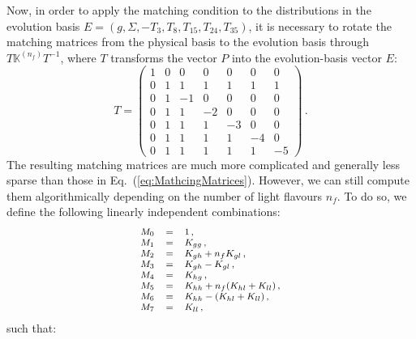 \documentclass[10pt,a4paper]{article}
\begin{document}
Now, in order to apply the matching condition to the distributions in
the evolution basis $E=(g,\Sigma,-T_3,T_8,T_{15},T_{24},T_{35})$, it is
necessary to rotate the matching matrices from the physical basis to
the evolution basis through $T\mathbb{K}^{(n_f)}T^{-1}$, where $T$
transforms the vector $P$ into the evolution-basis vector $E$:
\begin{equation}\label{eq:RotationMatrix}
T = 
\begin{pmatrix}
1 & 0 & 0  & 0  & 0  & 0  & 0 \\
0 & 1 & 1  & 1  & 1  & 1  & 1 \\
0 & 1 & -1  & 0  & 0  & 0  & 0 \\
0 & 1 & 1  & -2  & 0  & 0  & 0 \\
0 & 1 & 1  & 1  & -3  & 0  & 0 \\
0 & 1 & 1  & 1  & 1  & -4  & 0 \\
0 & 1 & 1  & 1  & 1  & 1  & -5
\end{pmatrix}\,.
\end{equation}
The resulting matching matrices are much more complicated and
generally less sparse than those in
Eq.~(\ref{eq:MathcingMatrices}). However, we can still compute them
algorithmically depending on the number of light flavours $n_f$. To do
so, we define the following linearly independent combinations:
\begin{equation}
\footnotesize
\begin{array}{lcl}
M_0 &=& 1\,,\\
M_1 &=& K_{gg}\,,\\
M_2 &=& K_{gh} + n_f K_{gl}\,,\\
M_3 &=& K_{gh}-K_{gl}\,,\\
M_4 &=& K_{hg}\,,\\
M_5 &=& K_{hh}+n_f(K_{hl}+K_{ll}) \,,\\
M_6 &=& K_{hh}-(K_{hl}+K_{ll})\,,\\
M_7 &=& K_{ll}\,,
\end{array}
\end{equation}
such that:
\end{document}
